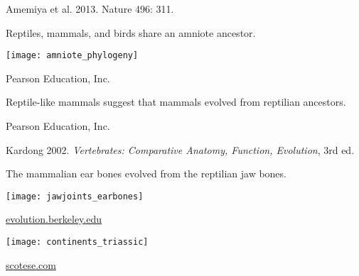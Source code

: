 \documentclass[t]{beamer}
\begin{document}
{
\begin{frame}[b]


\hfill \tiny Amemiya et al. 2013. Nature 496: 311.
\end{frame}
}
%
\begin{frame}[t]{Reptiles, mammals, and birds share an amniote ancestor.}
	\vspace*{-0.5\baselineskip}
	\begin{center}
		\texttt{[image: amniote\_phylogeny]}
	\end{center}

	\vfilll
	
	\hfill \tiny \textcopyright Pearson Education, Inc.
\end{frame}
%
{
\begin{frame}[b]{Reptile-like mammals suggest that mammals evolved from reptilian ancestors.}

\end{frame}
}
%
{
\begin{frame}[b]

	\hfill \tiny \textcopyright Pearson Education, Inc.
\end{frame}
}
%
{
\begin{frame}[b]

	\Tiny \textcopyright Kardong 2002. \textit{Vertebrates: Comparative Anatomy, Function, Evolution},  3rd ed.
\end{frame}
}
%
\begin{frame}[t]{The mammalian ear bones evolved from the reptilian jaw bones.}

	\vspace*{-\baselineskip}
	
	\begin{center}
		\texttt{[image: jawjoints\_earbones]}
	\end{center}
	\vfilll
	
	\hfill \tiny \href{http://evolution.berkeley.edu/evolibrary/article/homology_06}{evolution.berkeley.edu}
\end{frame}
%
{
\begin{frame}[t]
	\texttt{[image: continents\_triassic]}
	
	\vfilll
	
	\hfill \tiny \textcolor{white}{\href{http://scotese.com}{scotese.com}}
\end{frame}
}
%
\end{document}
